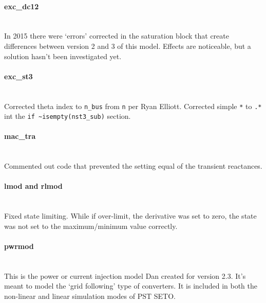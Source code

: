 \documentclass[12pt]{article}
\begin{document}
\paragraph{exc\_dc12} \ \\
In 2015 there were `errors' corrected in the saturation block that create differences between version 2 and 3 of this model.
Effects are noticeable, but a solution hasn't been investigated yet.

\paragraph{exc\_st3} \ \\
Corrected theta index to \verb|n_bus| from \verb|n| per Ryan Elliott.
Corrected simple \verb|*| to \verb|.*| int the \verb|if ~isempty(nst3_sub)| section.

\paragraph{mac\_tra} \ \\
Commented out code that prevented the setting equal of the transient reactances.

\paragraph{lmod and rlmod} \ \\
Fixed state limiting.
 While if over-limit, the derivative was set to zero, the state was not set to the maximum/minimum value correctly.

\paragraph{pwrmod} \ \\
This is the power or current injection model Dan created for version 2.3.
It's meant to model the `grid following' type of converters.
It is included in both the non-linear and linear simulation modes of PST SETO.
\end{document}
